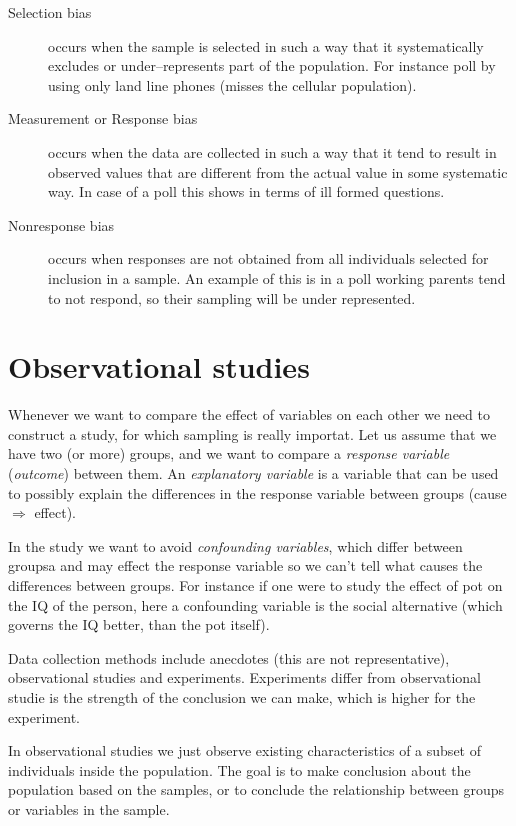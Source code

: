 \begin{description}
  \item[Selection bias] occurs when the sample is selected in such a way that it
  systematically excludes or under--represents part of the population. For
  instance poll by using only land line phones (misses the cellular population).
  \item[Measurement or Response bias] occurs when the data are collected in such
  a way that it tend to result in observed values that are different from the
  actual value in some systematic way. In case of a poll this shows in terms of
  ill formed questions.
  \item[Nonresponse bias] occurs when responses are not obtained from all
  individuals selected for inclusion in a sample. An example of this is in a
  poll working parents tend to not respond, so their sampling will be under
  represented.
\end{description}

\section{Observational studies}

Whenever we want to compare the effect of variables on each other we need to
construct a study, for which sampling is really importat. Let us assume that we
have two (or more) groups,  and we want to compare a \emph{response variable}
(\emph{outcome}) between them. An \emph{explanatory variable} is a variable that
can be used to possibly explain the differences in the response variable between
groups (cause $\Rightarrow$ effect).

In the study we want to avoid \emph{confounding variables}, which differ between
groupsa and may effect the response variable so we can't tell what causes the
differences between groups. For instance if one were to study the effect of pot
on the IQ of the person, here a confounding variable is the social alternative
(which governs the IQ better, than the pot itself). 

Data collection methods include anecdotes (this are not representative),
observational studies and experiments. Experiments differ from observational
studie is the strength of the conclusion we can make, which is higher for the
experiment.

In observational studies we just observe existing characteristics of a subset of
individuals inside the population. The goal is to make conclusion about the
population based on the samples, or to conclude the relationship between groups
or variables in the sample. 

